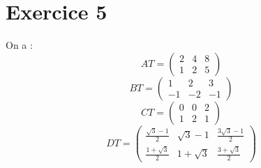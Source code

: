 \documentclass[a4paper, titlepage]{article}
\begin{document}
	\section*{Exercice 5}
	On a :
	$$ AT = \begin{pmatrix} 2&4&8\\ 1&2&5 \end{pmatrix} $$
	$$ BT = \begin{pmatrix} 1&2&3\\-1&-2&-1 \end{pmatrix}  $$
	$$ CT = \begin{pmatrix} 0&0&2\\1&2&1 \end{pmatrix}  $$
	$$ DT = \begin{pmatrix} \frac{\sqrt{3}-1}{2}&\sqrt{3}-1&\frac{3\sqrt{3}-1}{2}\\\frac{1+\sqrt{3}}{2}&1+\sqrt{3}&\frac{3+\sqrt{3}}{2} \end{pmatrix}  $$
\end{document}
